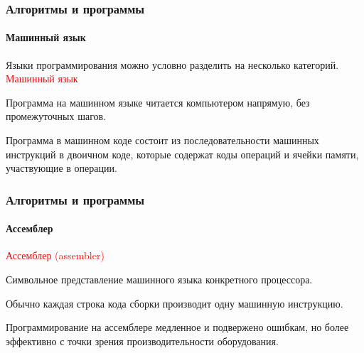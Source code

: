\documentclass[aspectratio=169]{beamer}
\begin{document}
\begin{frame}
\frametitle{Алгоритмы и программы}
\framesubtitle{Машинный язык}
\justifying
\small
Языки программирования можно условно разделить на несколько категорий.\newline\newline
\textcolor{red}{Машинный язык}

Программа на машинном языке читается компьютером напрямую, без промежуточных шагов.\newline

Программа в машинном коде состоит из последовательности машинных инструкций в двоичном коде, которые содержат коды операций и ячейки памяти, участвующие в операции.


\begin{figure}
    \captionsetup[subfigure]{labelformat=empty}
    \centering
\end{figure}
\end{frame}

\begin{frame}
\frametitle{Алгоритмы и программы}
\framesubtitle{Ассемблер}
\justifying
\small

\textcolor{red}{Ассемблер (assembler)}

Символьное представление машинного языка конкретного процессора.\newline

Обычно каждая строка кода сборки производит одну машинную инструкцию.\newline

Программирование на ассемблере медленное и подвержено ошибкам, но более эффективно с точки зрения производительности оборудования.

\begin{figure}
    \captionsetup[subfigure]{labelformat=empty}
    \centering
\end{figure}
\end{frame}
\end{document}
